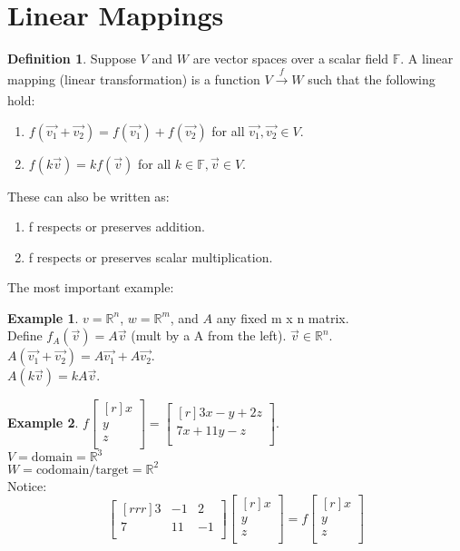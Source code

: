 \documentclass{report}
\theoremstyle{plain}
\theoremstyle{definition}
\newtheorem*{ex}{Example}
\newtheorem*{defn}{Definition}
\theoremstyle{plain}
\begin{document}
\section{Linear Mappings}
\begin{defn}
Suppose $V$ and $W$ are vector spaces over a scalar field $\mathbb{F}$. A linear mapping (linear transformation) is a function $V\xrightarrow[]{f} W$ such that the following hold:
\begin{enumerate}
\item $f(\vec{v_1}+\vec{v_2}) = f(\vec{v_1}) + f(\vec{v_2}) $ for all $\vec{v_1},\vec{v_2}\in V$.
\item $f(k\vec{v}) = kf(\vec{v})$ for all $k\in \mathbb{F}, \vec{v}\in V$.
\end{enumerate}
These can also be written as:
\begin{enumerate}
\item f respects or preserves addition.
\item f respects or preserves scalar multiplication.
\end{enumerate}
\end{defn}
The most important example:
\begin{ex}
$v=\mathbb{R}^n$, $w=\mathbb{R}^m$, and $A$ any fixed m x n matrix.\\
Define $f_A(\vec{v}) = A\vec{v}$ (mult by a A from the left). $\vec{v} \in \mathbb{R}^n$.\\
$A(\vec{v_1}+\vec{v_2}) = A\vec{v_1}+A\vec{v_2}$.\\
$A(k\vec{v})=kA\vec{v}$.
\end{ex}
\begin{ex}
$f\begin{bmatrix}[r]x\\y\\z\\\end{bmatrix} = \begin{bmatrix}[r]3x-y+2z\\7x+11y-z\\\end{bmatrix}$. \\
$V = \mathrm{domain} = \mathbb{R}^3$\\
$W= \mathrm{codomain/target} = \mathbb{R}^2$\\
Notice:
\[ \begin{bmatrix}[rrr]3&-1&2\\7&11&-1\\\end{bmatrix}\begin{bmatrix}[r]x\\y\\z\\\end{bmatrix}=f\begin{bmatrix}[r]x\\y\\z\\\end{bmatrix}
 \]
\end{ex}
\end{document}

